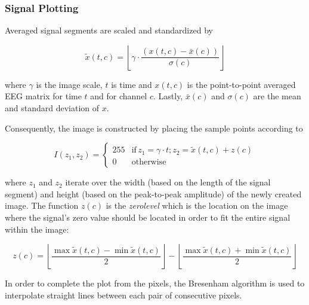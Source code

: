 \documentclass[entropy,article,submit,moreauthors,pdftex,10pt,a4paper]{mdpi}
\begin{document}

\subsubsection{Signal Plotting} \label{Plot}

Averaged signal segments are scaled and standardized by 

\begin{equation}
\tilde{x}(t,c) = \left \lfloor{ \gamma \cdot \frac{( x(t,c) - \bar{x}(c)  )}{ \sigma(c) } }\right \rfloor
\end{equation}

\noindent where $\gamma$ is the image scale, $t$ is time and $ x(t,c) $ is the point-to-point averaged EEG matrix for time $t$ and for  channel $c$. Lastly, $\bar{x}(c)$ and $ \sigma (c) $ are the mean and standard deviation of $x$.

Consequently, the image is constructed by placing the sample points according to

\begin{equation}
I(z_1,z_2) = \left\{ \begin{array}{rl}
255 & \text{if} \,  z_1 = \gamma \cdot t; z_2 = \tilde{x}(t,c) + z(c) \\
0   & \mbox{otherwise}
\end{array}\right.
\label{eq:images}
\end{equation}

\noindent where $ z_1$ and $z_2$ iterate over the width (based on the length of the signal segment) and height (based on the peak-to-peak amplitude) of the newly created image.  The function $z(c)$ is the \textit{zerolevel} which is the location on the image where the signal's zero value should be located in order to fit the entire signal within the image:

\begin{equation}
z(c) = \left \lfloor{ \frac{\max \tilde{x}(t,c)  - \min \tilde{x}(t,c) }{2} }\right \rfloor -   \left \lfloor{ \frac{\max \tilde{x}(t,c)  + \min \tilde{x}(t,c)}{ 2} }\right \rfloor
\label{eq:zerolevel}
\end{equation}
  
In order to complete the plot from the pixels, the Bresenham \citep{Bresenham1965,Ramele2016} algorithm is used to interpolate straight lines between each pair of  consecutive pixels.
\end{document}
